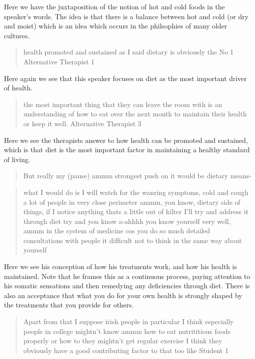 Here we have the juxtaposition of the notion of hot and cold foods in the speaker's words. The idea is that there is a balance between hot and cold (or dry and moist) which is an idea which occurs in the philsophies of many older cultures. 

\begin{quotation}
   health promoted and sustained as I said dietary is obviously the No 1
Alternative Therapist 1
\end{quotation}

Here again we see that this speaker focuses on diet as the most important driver of health. 


 \begin{quotation}
 the most important thing that they can leave the room with is an understanding of how to eat over the next month to maintain their health or keep it well.    
Alternative Therapist 3
 \end{quotation}

Here we see the therapists answer to how health can be promoted and sustained, which is that diet is the most important factor in maintaining a healthy standard of living. 

\begin{quotation}
  But really my (pause) ammm strongest push on it would be dietary means-

\end{quotation}

\begin{quotation}
  what I would do is I will watch for the wanring symptoms, cold and cough a lot of people in very close perimeter ammm, you know, dietary side of things, if I notice anything thats a little out of kilter I'll try and address it through diet try and you know a-ahhhh you know yourself very well, ammm in the system of medicine cos you do so much detailed consultations with people it difficult not to think in the same way about yourself

\end{quotation}

Here we see his conception of how his treatments work, and how his health is maintained. Note that he frames this as a continuous process, paying attention to his somatic sensations and then remedying any deficiencies through diet. There is also an acceptance that what you do for your own health is strongly shaped by the treatments that you provide for others. 

\begin{quotation}
  Apart from that I suppose irish people in particular I think especially people in college mightn't know ammm how to eat nutrititious foods properly or how to they mightn't get regular exercise I think they obviously have a good contributing factor to that too like
Student 1
\end{quotation}


